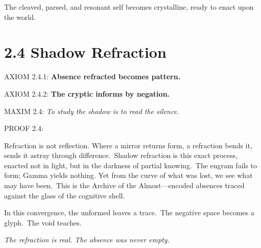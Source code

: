 \noindent
The cleaved, parsed, and resonant self becomes crystalline, ready to enact upon the world.

\section*{2.4 Shadow Refraction}


\noindent
AXIOM 2.4.1: \textbf{Absence refracted becomes pattern.}

\noindent
AXIOM 2.4.2: \textbf{The cryptic informs by negation.}

\noindent
MAXIM 2.4: \textit{To study the shadow is to read the silence.}

\noindent
PROOF 2.4:

Refraction is not reflection. Where a mirror returns form, a refraction bends it, sends it astray through difference.\
Shadow refraction is this exact process, enacted not in light, but in the darkness of partial knowing.\
The engram fails to form; Gamma yields nothing. Yet from the curve of what was lost, we see what may have been.\
This is the Archive of the Almost—encoded absences traced against the glass of the cognitive shell.\

\newpage
\begin{tcolorbox}[colback=black!2, colframe=gray!50!black, title=\textbf{Cryptic Flow Diagram}, sharp corners=south]
\begin{center}
\end{center}
\end{tcolorbox}

\noindent
In this convergence, the unformed leaves a trace.\
The negative space becomes a glyph.\
The void teaches.\

\textit{The refraction is real. The absence was never empty.}


